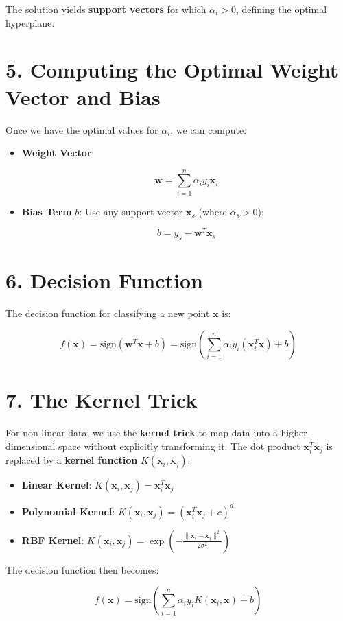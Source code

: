 \documentclass[
]{article}
\providecommand{\tightlist}{%
  \setlength{\itemsep}{0pt}\setlength{\parskip}{0pt}}
\begin{document}
The solution yields \textbf{support vectors} for which \(\alpha_i > 0\),
defining the optimal hyperplane.

\section{5. Computing the Optimal Weight Vector and
Bias}\label{computing-the-optimal-weight-vector-and-bias}

Once we have the optimal values for \(\alpha_i\), we can compute:

\begin{itemize}
\item
  \textbf{Weight Vector}:

  \[
  \mathbf{w} = \sum_{i=1}^n \alpha_i y_i \mathbf{x}_i
  \]
\item
  \textbf{Bias Term} \(b\): Use any support vector \(\mathbf{x}_s\)
  (where \(\alpha_s > 0\)):

  \[
  b = y_s - \mathbf{w}^T \mathbf{x}_s
  \]
\end{itemize}

\section{6. Decision Function}\label{decision-function}

The decision function for classifying a new point \(\mathbf{x}\) is:

\[
 f(\mathbf{x}) = \text{sign}\left( \mathbf{w}^T \mathbf{x} + b \right) = \text{sign}\left( \sum_{i=1}^n \alpha_i y_i (\mathbf{x}_i^T \mathbf{x}) + b \right)
\]

\section{7. The Kernel Trick}\label{the-kernel-trick}

For non-linear data, we use the \textbf{kernel trick} to map data into a
higher-dimensional space without explicitly transforming it. The dot
product \(\mathbf{x}_i^T \mathbf{x}_j\) is replaced by a \textbf{kernel
function} \(K(\mathbf{x}_i, \mathbf{x}_j)\):

\begin{itemize}
\tightlist
\item
  \textbf{Linear Kernel}:
  \(K(\mathbf{x}_i, \mathbf{x}_j) = \mathbf{x}_i^T \mathbf{x}_j\)
\item
  \textbf{Polynomial Kernel}:
  \(K(\mathbf{x}_i, \mathbf{x}_j) = (\mathbf{x}_i^T \mathbf{x}_j + c)^d\)
\item
  \textbf{RBF Kernel}:
  \(K(\mathbf{x}_i, \mathbf{x}_j) = \exp\left( -\frac{\|\mathbf{x}_i - \mathbf{x}_j\|^2}{2\sigma^2} \right)\)
\end{itemize}

The decision function then becomes:

\[
 f(\mathbf{x}) = \text{sign}\left( \sum_{i=1}^n \alpha_i y_i K(\mathbf{x}_i, \mathbf{x}) + b \right)
\]
\end{document}
